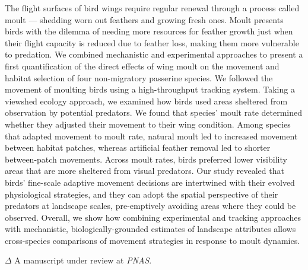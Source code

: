     The flight surfaces of bird wings require regular renewal through a process called moult --- shedding worn out feathers and growing fresh ones.
    Moult presents birds with the dilemma of needing more resources for feather growth just when their flight capacity is reduced due to feather loss, making them more vulnerable to predation.
    We combined mechanistic and experimental approaches to present a first quantification of the direct effects of wing moult on the movement and habitat selection of four non-migratory passerine species. 
    We followed the movement of moulting birds using a high-throughput tracking system. 
    Taking a viewshed ecology approach, we examined how birds used areas sheltered from observation by potential predators.
    We found that species' moult rate determined whether they adjusted their movement to their wing condition.
    Among species that adapted movement to moult rate, natural moult led to increased movement between habitat patches, whereas artificial feather removal led to shorter between-patch movements. 
    Across moult rates, birds preferred lower visibility areas that are more sheltered from visual predators.
    Our study revealed that birds' fine-scale adaptive movement decisions are intertwined with their evolved physiological strategies, and they can adopt the spatial perspective of their predators at landscape scales, pre-emptively avoiding areas where they could be observed.
    Overall, we show how combining experimental and tracking approaches with mechanistic, biologically-grounded estimates of landscape attributes allows cross-species comparisons of movement strategies in response to moult dynamics.

    \bigskip

    {\noindent \large{$\Delta$}} \normalfont A manuscript under review at \textit{PNAS}.


\clearpage
